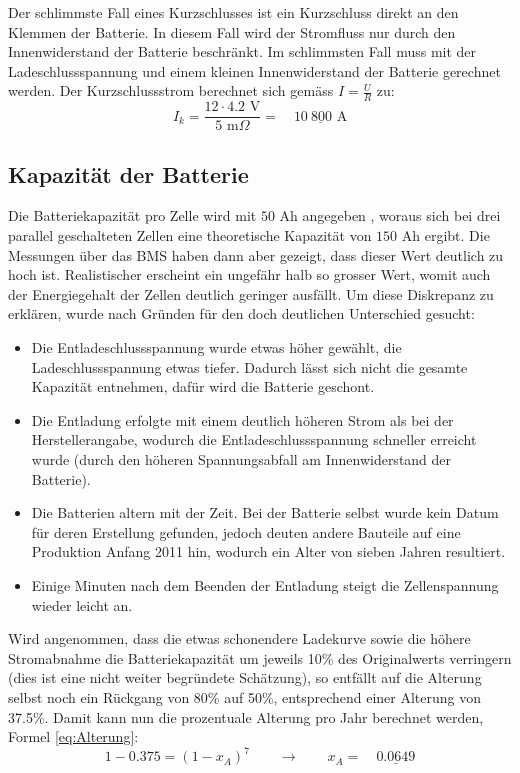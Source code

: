 Der schlimmste Fall eines Kurzschlusses ist ein Kurzschluss direkt an den Klemmen der Batterie. In diesem Fall wird der Stromfluss nur durch den Innenwiderstand der Batterie beschränkt. Im schlimmsten Fall muss mit der Ladeschlussspannung und einem kleinen Innenwiderstand der Batterie gerechnet werden. Der Kurzschlussstrom berechnet sich gemäss $I=\frac{U}{R}$ zu:
\begin{equation*}
	I_k=\frac{12\cdot 4.2\text{ V}}{5\text{ m}\Omega}=\quad\underline{10\ 800\text{ A}}
\end{equation*}

\subsection{Kapazität der Batterie}\label{sec:ah}
\color{blue}Die Batteriekapazität pro Zelle wird mit $50$ Ah angegeben \cite{lev50}, woraus sich bei drei parallel geschalteten Zellen eine theoretische Kapazität von $150$ Ah ergibt. Die Messungen über das BMS haben dann aber gezeigt, dass dieser Wert deutlich zu hoch ist. Realistischer erscheint ein ungefähr halb so grosser Wert, womit auch der Energiegehalt der Zellen deutlich geringer ausfällt. Um diese Diskrepanz zu erklären, wurde nach Gründen für den doch deutlichen Unterschied gesucht: \begin{itemize}
	\item Die Entladeschlussspannung wurde etwas höher gewählt, die Ladeschlussspannung etwas tiefer. Dadurch lässt sich nicht die gesamte Kapazität entnehmen, dafür wird die Batterie geschont.
	\item Die Entladung erfolgte mit einem deutlich höheren Strom als bei der Herstellerangabe, wodurch die Entladeschlussspannung schneller erreicht wurde (durch den höheren Spannungsabfall am Innenwiderstand der Batterie).
	\item Die Batterien altern mit der Zeit. Bei der Batterie selbst wurde kein Datum für deren Erstellung gefunden, jedoch deuten andere Bauteile auf eine Produktion Anfang 2011 hin, wodurch ein Alter von sieben Jahren resultiert.
	\item Einige Minuten nach dem Beenden der Entladung steigt die Zellenspannung wieder leicht an.
\end{itemize}

Wird angenommen, dass die etwas schonendere Ladekurve sowie die höhere Stromabnahme die Batteriekapazität um jeweils 10\% des Originalwerts verringern (dies ist eine nicht weiter begründete Schätzung), so entfällt auf die Alterung selbst noch ein Rückgang von 80\% auf 50\%, entsprechend einer Alterung von 37.5\%. Damit kann nun die prozentuale Alterung pro Jahr berechnet werden, Formel \ref{eq:Alterung}:
\begin{equation}
	1-0.375=\left(1-x_A\right)^7\qquad\rightarrow\qquad x_A=\quad\underline{0.0649}
\label{eq:Alterung}
\end{equation}

